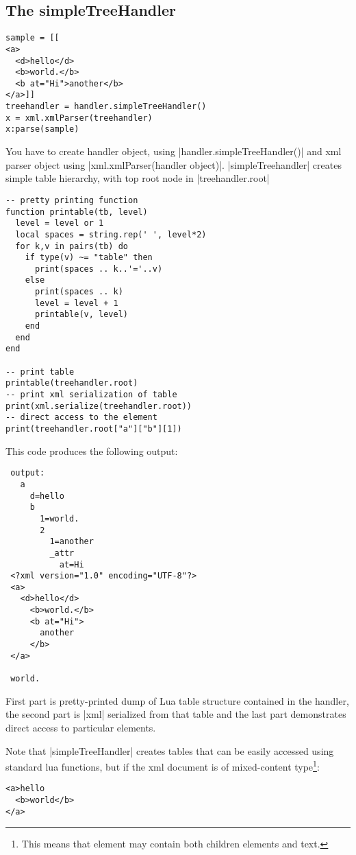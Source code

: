 \documentclass{ltxdoc}
\begin{document}
\subsection{The simpleTreeHandler} 
\begin{verbatim}
sample = [[
<a>
  <d>hello</d>
  <b>world.</b>
  <b at="Hi">another</b>
</a>]]
treehandler = handler.simpleTreeHandler()
x = xml.xmlParser(treehandler)
x:parse(sample)
\end{verbatim} 

You have to create handler object, using |handler.simpleTreeHandler()| and xml
parser object using |xml.xmlParser(handler object)|. |simpleTreehandler|
creates simple table hierarchy, with top root node in |treehandler.root|

\begin{verbatim}
-- pretty printing function
function printable(tb, level)
  level = level or 1
  local spaces = string.rep(' ', level*2)
  for k,v in pairs(tb) do
    if type(v) ~= "table" then
      print(spaces .. k..'='..v)
    else
      print(spaces .. k)
      level = level + 1
      printable(v, level)
    end
  end
end

-- print table
printable(treehandler.root)
-- print xml serialization of table
print(xml.serialize(treehandler.root))
-- direct access to the element
print(treehandler.root["a"]["b"][1])
\end{verbatim}

This code produces the following output:

\begin{verbatim}
 output:
   a
     d=hello
     b
       1=world.
       2
         1=another
         _attr
           at=Hi
 <?xml version="1.0" encoding="UTF-8"?>
 <a>
   <d>hello</d>
     <b>world.</b>
     <b at="Hi">
       another
     </b>
 </a>
 
 world.
\end{verbatim}

First part is pretty-printed dump of Lua table structure contained in the handler, the second
part is |xml| serialized from that table and the last part demonstrates direct access to particular
elements.

Note that |simpleTreeHandler| creates tables that can be easily accessed using
standard lua functions, but if the xml document is of mixed-content type\footnote{%
This means that element may contain both children elements and text.}:

\begin{verbatim}
<a>hello
  <b>world</b>
</a>	  
\end{verbatim}
\end{document}
